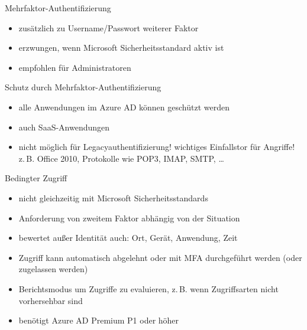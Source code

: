 \begin{flashcard}[Definition]{Mehrfaktor-Authentifizierung}
  \begin{itemize}
    \item zusätzlich zu Username/Passwort weiterer Faktor
    \item erzwungen, wenn Microsoft Sicherheitsstandard aktiv ist
    \item empfohlen für Administratoren
  \end{itemize}
\end{flashcard}

\begin{flashcard}[Definition]{Schutz durch Mehrfaktor-Authentifizierung}
  \begin{itemize}
    \item alle Anwendungen im Azure AD können geschützt werden
    \item auch SaaS-Anwendungen
    \item nicht möglich für Legacyauthentifizierung!\newline
    wichtiges Einfallstor für Angriffe!\newline
    z.\,B. Office 2010, Protokolle wie POP3, IMAP, SMTP, \ldots
  \end{itemize}
\end{flashcard}

\begin{flashcard}[Definition]{Bedingter Zugriff}
  \begin{itemize}
    \item nicht gleichzeitig mit Microsoft Sicherheitsstandards
    \item Anforderung von zweitem Faktor abhängig von der Situation
    \item bewertet außer Identität auch:\newline
      Ort, Gerät, Anwendung, Zeit
    \item Zugriff kann automatisch abgelehnt oder mit MFA durchgeführt werden\newline
      (oder zugelassen werden)
    \item Berichtsmodus um Zugriffe zu evaluieren, z.\,B. wenn Zugriffsarten nicht vorhersehbar sind
    \item benötigt Azure AD Premium P1 oder höher
  \end{itemize}
\end{flashcard}

